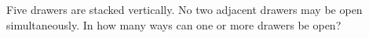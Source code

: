 Five drawers are stacked vertically. No two adjacent drawers may be open simultaneously. In how many ways can one or more drawers be open?
